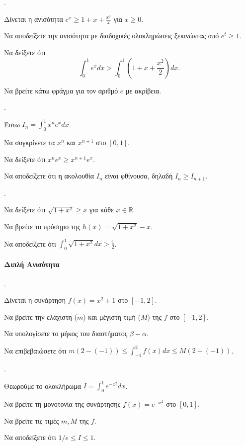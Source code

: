 \documentclass[11pt,a4paper,twocolumn]{article}
\newcounter{askhsh}
\newcommand{\askhsh}{\large\theaskhsh.\ \addtocounter{askhsh}{1}}
\begin{document}
\askhsh Δίνεται η ανισότητα $e^x \ge 1+x+\frac{x^2}{2}$ για $x \ge 0$.
\begin{alist}
\item Να αποδείξετε την ανισότητα με διαδοχικές ολοκληρώσεις ξεκινώντας από $e^t \ge 1$.
\item Να δείξετε ότι \[\displaystyle \int_0^1 e^x dx > \int_0^1 \left(1+x+\frac{x^2}{2}\right) dx.\]
\item Να βρείτε κάτω φράγμα για τον αριθμό $e$ με ακρίβεια.
\end{alist}

\askhsh Έστω $I_n = \displaystyle \int_0^1 x^n e^x dx$.
\begin{alist}
\item Να συγκρίνετε τα $x^n$ και $x^{n+1}$ στο $[0,1]$.
\item Να δείξετε ότι $x^n e^x \ge x^{n+1} e^x$.
\item Να αποδείξετε ότι η ακολουθία $I_n$ είναι φθίνουσα, δηλαδή $I_n \ge I_{n+1}$.
\end{alist}

\askhsh 
\begin{alist}
\item Να δείξετε ότι $\sqrt{1+x^2} \ge x$ για κάθε $x \in \mathbb{R}$.
\item Να βρείτε το πρόσημο της $h(x) = \sqrt{1+x^2} - x$.
\item Να αποδείξετε ότι $\displaystyle \int_0^1 \sqrt{1+x^2} dx > \frac{1}{2}$.
\end{alist}

\paragraph{Διπλή Ανισότητα}

\askhsh Δίνεται η συνάρτηση $f(x) = x^2+1$ στο $[-1, 2]$.
\begin{alist}
\item Να βρείτε την ελάχιστη ($m$) και μέγιστη τιμή ($M$) της $f$ στο $[-1, 2]$.
\item Να υπολογίσετε το μήκος του διαστήματος $\beta - \alpha$.
\item Να επιβεβαιώσετε ότι $m(2-(-1)) \le \int_{-1}^2 f(x) dx \le M(2-(-1))$.
\end{alist}

\askhsh Θεωρούμε το ολοκλήρωμα $I = \displaystyle \int_0^1 e^{-x^2} dx$.
\begin{alist}
\item Να βρείτε τη μονοτονία της συνάρτησης $f(x) = e^{-x^2}$ στο $[0,1]$.
\item Να βρείτε τις τιμές $m, M$ της $f$.
\item Να αποδείξετε ότι $1/e \le I \le 1$.
\end{alist}
\end{document}
